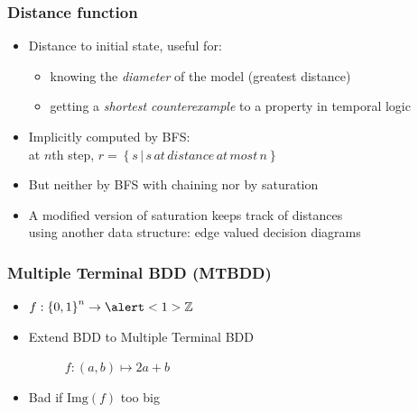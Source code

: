 \documentclass{beamer}
\newcommand{\Z}{\mathbb{Z}}
\begin{document}
\begin{frame}
  \frametitle{Distance function}

  \begin{itemize}
  \item Distance to initial state, useful for:
    \begin{itemize}
    \item knowing the \emph{diameter} of the model (greatest distance)
    \item getting a \emph{shortest counterexample} to a property in temporal logic
    \end{itemize}
    \pause
  \item Implicitly computed by BFS:\\
    at $n$th step, $r = \left\{s \,|\, s \, at \, distance \, at \, most \, n\right\}$
    \pause
  \item But neither by BFS with chaining nor by saturation
  \item A modified version of saturation keeps track of distances\\
    using another data structure: edge valued decision diagrams
  \end{itemize}
\end{frame}

\begin{frame}
  \frametitle{Multiple Terminal BDD (MTBDD)}
  \begin{itemize}
  \item $f : \left\{0, 1\right\}^n \rightarrow \alert<1>{\Z}$
    \pause
  \item Extend BDD to \alert<2>{Multiple Terminal BDD}
    {\normalsize
    \begin{center}
      \begin{figure}
        \caption{$f : (a, b) \mapsto 2a+b$}
      \end{figure}
    \end{center}}
    \pause
  \item Bad if $\mathrm{Img}\left(f\right)$ too big
  \end{itemize}
\end{frame}
\end{document}

